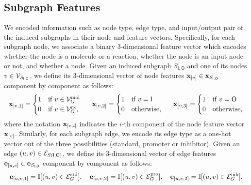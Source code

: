 \subsection{Subgraph Features}
We encoded information such as node type, edge type, and input/output pair of the induced subgraphs in their node and feature vectors. Specifically, for each subgraph node, we associate a binary 3-dimensional feature vector which encodes whether the node is a molecule or a reaction, whether the node is an input node or not, and whether a node. Given an induced subgraph $S_{\mathsf{I},\mathsf{O}}$ and one of its nodes $v \in \Cal{V}_{S_{\mathsf{I},\mathsf{O}}}$, we define its 3-dimensional vector of node features $\Elem{x}{v} \in \Vector{x}_{S_{\mathsf{I},\mathsf{O}}}$ component by component as follows:
\begin{align*}
    \Elem{x}{v, 1} = \begin{cases}
        1  & \mathrm{if}\; v \in \Cal{V}_{G}^{\Fun{mol}}\\
        0  & \mathrm{if}\; v \in \Cal{V}_{G}^{\Fun{rx}},
    \end{cases}
    \hspace{1.5em}
    \Elem{x}{v, 2} = \begin{cases}
        1  & \mathrm{if}\; v = \mathsf{I}\\
        0  & \mathrm{otherwise},
    \end{cases}
    \hspace{1.5em}
    \Elem{x}{v, 3} = \begin{cases}
        1  & \mathrm{if}\; v = \mathsf{O}\\
        0  & \mathrm{otherwise},
    \end{cases}
\end{align*}
where the notation $\Elem{x}{v, i}$ indicates the $i$-th component of the node feature vector $\Elem{x}{v}$.
Similarly, for each subgraph edge, we encode its edge type as a one-hot vector out of the three possibilities (standard, promoter or inhibitor). Given an edge $(u,v) \in \Cal{E}_{S(\mathsf{I},\mathsf{O})}$, we define its 3-dimensional vector of edge features $\Elem{e}{u, v} \in \Vector{e}_{S_{\mathsf{I},\mathsf{O}}}$ component by component as follows:
\begin{align*}
    \Elem{e}{u, v, 1} = \mathbb{I}[(u,v) \in \Cal{E}_{G}^{\Fun{std}}], \quad
    \Elem{e}{u, v, 2} = \mathbb{I}[(u,v) \in \Cal{E}_{G}^{\Fun{pro}}], \quad
    \Elem{e}{u, v, 3} = \mathbb{I}[(u,v) \in \Cal{E}_{G}^{\Fun{inh}}],
\end{align*}
